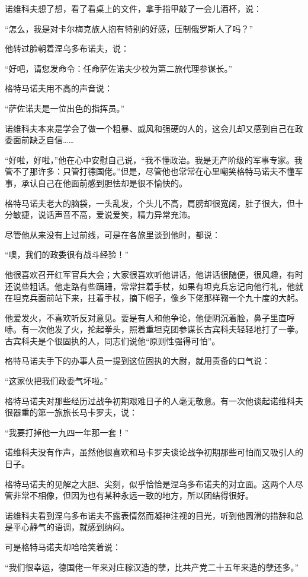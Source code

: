 诺维科夫想了想，看了看桌上的文件，拿手指甲敲了一会儿酒杯，说：

“怎么，我是对卡尔梅克族人抱有特别的好感，压制俄罗斯人了吗？”

他转过脸朝着涅乌多布诺夫，说：

“好吧，请您发命令：任命萨佐诺夫少校为第二旅代理参谋长。”

格特马诺夫用不高的声音说：

“萨佐诺夫是一位出色的指挥员。”

诺维科夫本来是学会了做一个粗暴、威风和强硬的人的，这会儿却又感到自己在政委面前缺乏自信……

“好啦，好啦，”他在心中安慰自己说，“我不懂政治。我是无产阶级的军事专家。我管不了那许多：只管打德国佬。”但是，尽管他也常常在心里嘲笑格特马诺夫不懂军事，承认自己在他面前感到胆怯却是很不愉快的。

格特马诺夫老大的脑袋，一头乱发，个头儿不高，肩膀却很宽阔，肚子很大，但十分敏捷，说话声音不高，爱说爱笑，精力异常充沛。

尽管他从来没有上过前线，可是在各旅里谈到他时，都说：

“噢，我们的政委很有战斗经验！”

他很喜欢召开红军官兵大会；大家很喜欢听他讲话，他讲话很随便，很风趣，有时还说些粗话。他走路有些蹒跚，常常拄着手杖，如果有坦克兵忘记向他行礼，他就在坦克兵面前站下来，拄着手杖，摘下帽子，像乡下佬那样鞠一个九十度的大躬。

他爱发火，不喜欢听反对意见。要是有人和他争论，他便阴沉着脸，鼻子里直哼哧。有一次他发了火，抡起拳头，照着重坦克团参谋长古宾科夫轻轻地打了一拳。古宾科夫是个很固执的人，同志们说他“原则性强得可怕”。

格特马诺夫手下的办事人员一提到这位固执的大尉，就用责备的口气说：

“这家伙把我们政委气坏啦。”

格特马诺夫对那些经历过战争初期艰难日子的人毫无敬意。有一次他谈起诺维科夫很器重的第一旅旅长马卡罗夫，说：

“我要打掉他一九四一年那一套！”

诺维科夫没有作声，虽然他很喜欢和马卡罗夫谈论战争初期那些可怕而又吸引人的日子。

格特马诺夫的见解之大胆、尖刻，似乎恰恰是涅乌多布诺夫的对立面。这两个人尽管非常不相像，但因为也有某种永远一致的地方，所以团结得很好。

诺维科夫看到涅乌多布诺夫不露表情然而凝神注视的目光，听到他圆滑的措辞和总是平心静气的语调，就感到纳闷。

可是格特马诺夫却哈哈笑着说：

“我们很幸运，德国佬一年来对庄稼汉造的孽，比共产党二十五年来造的孽还多。”

